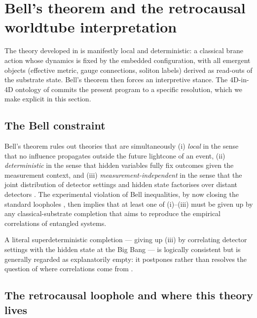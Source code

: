 \section{Bell's theorem and the retrocausal worldtube interpretation}
\label{sec:bell-interpretation}

The theory developed in  is manifestly local and deterministic: a classical brane action whose dynamics is fixed by the embedded configuration, with all emergent objects (effective metric, gauge connections, soliton labels) derived as read-outs of the substrate state.
Bell's theorem then forces an interpretive stance.
The 4D-in-4D ontology of  commits the present program to a specific resolution, which we make explicit in this section.

\subsection{The Bell constraint}

Bell's theorem rules out theories that are simultaneously
(i) \emph{local} in the sense that no influence propagates outside the future lightcone of an event,
(ii) \emph{deterministic} in the sense that hidden variables fully fix outcomes given the measurement context,
and (iii) \emph{measurement-independent} in the sense that the joint distribution of detector settings and hidden state factorises over distant detectors \citep{Bell1964,CHSH1969}.
The experimental violation of Bell inequalities, by now closing the standard loopholes \citep{Hensen2015,Giustina2015,Shalm2015}, then implies that at least one of (i)--(iii) must be given up by any classical-substrate completion that aims to reproduce the empirical correlations of entangled systems.

A literal superdeterministic completion --- giving up (iii) by correlating detector settings with the hidden state at the Big Bang --- is logically consistent but is generally regarded as explanatorily empty: it postpones rather than resolves the question of where correlations come from \citep{Hossenfelder2020Superdeterminism}.

\subsection{The retrocausal loophole and where this theory lives}

